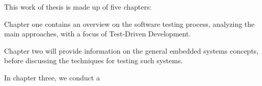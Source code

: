 This work of thesis is made up of five chapters:

Chapter one contains an overview on the software testing process, analyzing the main approaches, with a focus of Test-Driven Development.

Chapter two will provide information on the general embedded systems concepts, before discussing the techniques for testing such systems.

In chapter three, we conduct a 